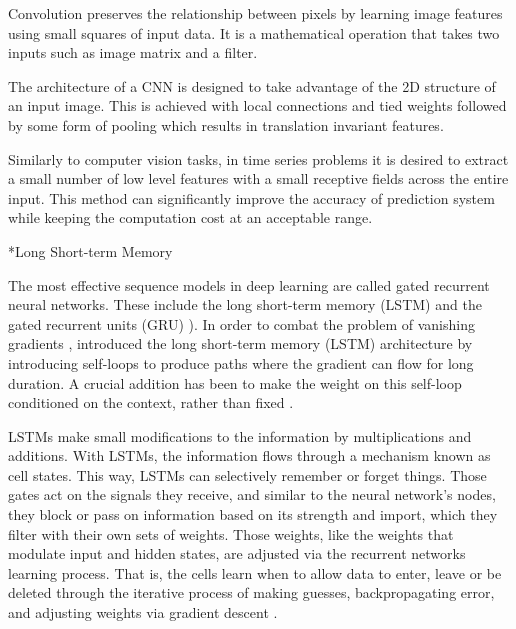 \documentclass[twocolumn, a4paper,10pt]{article}
\makeatletter
\renewcommand\subsubsection{\@startsection{subsection}{1}{\z@}{0.2cm}{0.1cm}{\normalfont\normalsize\itshape}}
\makeatother
\begin{document}
Convolution preserves the relationship between pixels by learning image features using small squares of input data. It is a mathematical operation that takes two inputs such as image matrix and a filter.

The architecture of a CNN is designed to take advantage of the 2D structure of an input image. This is achieved with local connections and tied weights followed by some form of pooling which results in translation invariant features. 

Similarly to computer vision tasks, in time series problems it is desired to extract a small number of low level features with a small receptive fields across the entire input. This method can significantly improve the accuracy of prediction system while keeping the computation cost at an acceptable range.

\subsubsection*{Long Short-term Memory}

The most eﬀective sequence models in deep learning are called gated recurrent neural networks. These include the long short-term memory (LSTM) and the gated recurrent units (GRU) \citep{RN1282}). In order to combat the problem of vanishing gradients \citep{RN1289}, \cite{RN1288} introduced the long short-term memory (LSTM) architecture by introducing self-loops to produce paths where the gradient can ﬂow for long duration. A crucial addition has been to make the weight on this self-loop conditioned on the context, rather than ﬁxed \citep{RN1290}.

LSTMs make small modifications to the information by multiplications and additions. With LSTMs, the information flows through a mechanism known as cell states. This way, LSTMs can selectively remember or forget things. Those gates act on the signals they receive, and similar to the neural network’s nodes, they block or pass on information based on its strength and import, which they filter with their own sets of weights. Those weights, like the weights that modulate input and hidden states, are adjusted via the recurrent networks learning process. That is, the cells learn when to allow data to enter, leave or be deleted through the iterative process of making guesses, backpropagating error, and adjusting weights via gradient descent \citep{RN1282}.
\end{document}
